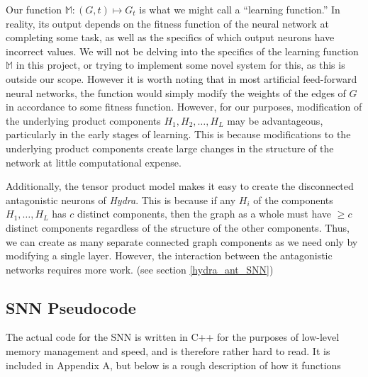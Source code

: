 \documentclass{article}
\newcommand{\listvec}[2]{#1_1, #1_2, \ldots, #1_{#2}}
\newcommand{\M}{\mathbb{M}}
\begin{document}
Our function $\M : (G, t) \mapsto G_t$ is what we might call a ``learning function.'' In reality, its output depends on the fitness function of the neural network at completing some task, as well as the specifics of which output neurons have incorrect values. We will not be delving into the specifics of the learning function $\M$ in this project, or trying to implement some novel system for this, as this is outside our scope. However it is worth noting that in most artificial feed-forward neural networks, the function would simply modify the weights of the edges of $G$ in accordance to some fitness function. However, for our purposes, modification of the underlying product components $\listvec{H}{L}$ may be advantageous, particularly in the early stages of learning. This is because modifications to the underlying product components create large changes in the structure of the network at little computational expense.

Additionally, the tensor product model makes it easy to create the disconnected antagonistic neurons of \emph{Hydra}. This is because if any $H_i$ of the components $H_1, \ldots, H_L$ has $c$ distinct components, then the graph as a whole must have $\geq c$ distinct components regardless of the structure of the other components. Thus, we can create as many separate connected graph components as we need only by modifying a single layer. However, the interaction between the antagonistic networks requires more work. (see section \ref{hydra_ant_SNN})

\newpage

\subsection{SNN Pseudocode} \label{pseudocode}

The actual code for the SNN is written in C++ for the purposes of low-level memory management and speed, and is therefore rather hard to read. It is included in Appendix A, but below is a rough description of how it functions
\end{document}
